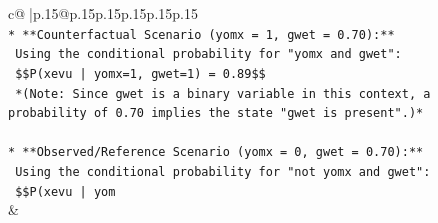 \documentclass{article}
\begin{document}
{\begin{supertabular}{c@{$\;$}|p{.15\linewidth}@{}p{.15\linewidth}p{.15\linewidth}p{.15\linewidth}p{.15\linewidth}p{.15\linewidth}}
{{{\\ 
\texttt{*   **Counterfactual Scenario (yomx = 1, gwet = 0.70):**} \\
\texttt{    Using the conditional probability for "yomx and gwet":} \\
\texttt{    \$\$P(xevu | yomx=1, gwet=1) = 0.89\$\$} \\
\texttt{    *(Note: Since gwet is a binary variable in this context, a probability of 0.70 implies the state "gwet is present".)*} \\
\\ 
\texttt{*   **Observed/Reference Scenario (yomx = 0, gwet = 0.70):**} \\
\texttt{    Using the conditional probability for "not yomx and gwet":} \\
\texttt{    \$\$P(xevu | yom} \\
            }
        }
    }
    & \\ \\


\end{supertabular}}
\end{document}
